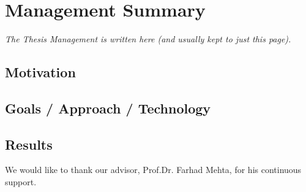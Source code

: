 \chapter{Management Summary}
\addchaptertocentry{\abstractname} %
\emph{The Thesis Management is written here (and usually kept to just this page).}


\section*{Motivation} %

\section*{Goals / Approach / Technology}

\section*{Results}



\begin{acknowledgements}
\addchaptertocentry{\acknowledgementname} %
We would like to thank our advisor, Prof.Dr. Farhad Mehta, for his continuous support.

\end{acknowledgements}


\setcounter{tocdepth}{2}
\tableofcontents %




